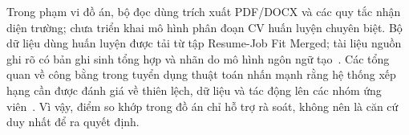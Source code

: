 Trong phạm vi đồ án, bộ đọc dùng trích xuất PDF/DOCX và các quy tắc nhận diện trường; chưa triển khai mô hình phân đoạn CV huấn luyện chuyên biệt. Bộ dữ liệu dùng huấn luyện được tải từ tập Resume-Job Fit Merged; tài liệu nguồn ghi rõ có bản ghi sinh tổng hợp và nhãn do mô hình ngôn ngữ tạo~\cite{ResumeJobFit2026}. Các tổng quan về công bằng trong tuyển dụng thuật toán nhấn mạnh rằng hệ thống xếp hạng cần được đánh giá về thiên lệch, dữ liệu và tác động lên các nhóm ứng viên~\cite{Fabris2025}. Vì vậy, điểm so khớp trong đồ án chỉ hỗ trợ rà soát, không nên là căn cứ duy nhất để ra quyết định.

